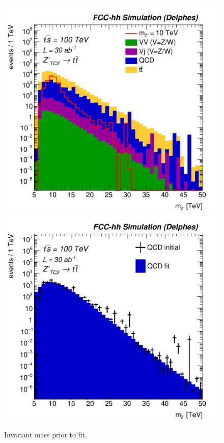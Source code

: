 \documentclass[a4paper,11pt]{article}
\begin{document}
\begin{figure}[!htb]\centering
\includegraphics[width=0.49\columnwidth]{Fig/Zptt/Mj1j2_pf08_MetCorr_sel8_nostack_log-eps-converted-to.pdf}
\includegraphics[width=0.49\columnwidth]{Fig/Zptt/Zptt_QCD_sel8_Mj1j2_pf08_MetCorr_fit-eps-converted-to.pdf}
\caption{Invariant mass prior to fit.}
\label{fig:hadronicresonances_nofit}
\end{figure}



\end{document}
